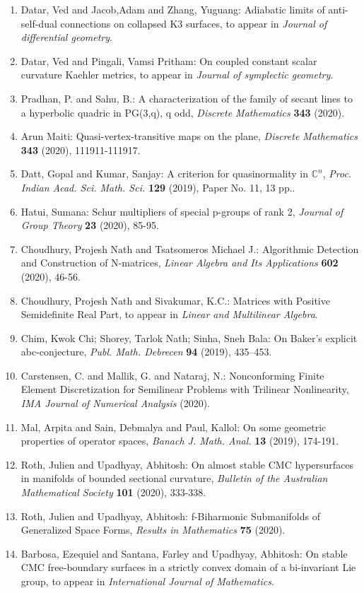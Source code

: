 \begin{enumerate}
\item Datar, Ved and Jacob,Adam and Zhang, Yuguang: Adiabatic limits of anti-self-dual connections on collapsed K3 surfaces, to appear in \emph{Journal of differential geometry}.
\item Datar, Ved and Pingali, Vamsi Pritham: On coupled constant scalar curvature Kaehler metrics, to appear in \emph{Journal of symplectic geometry}.
\item Pradhan, P. and Sahu, B.: A characterization of the family of secant lines to a hyperbolic quadric in PG(3,q), q odd, \emph{Discrete Mathematics} {\bf 343} (2020).
\item Arun Maiti: Quasi-vertex-transitive maps on the plane, \emph{Discrete Mathematics} {\bf 343} (2020), 111911-111917.
\item Datt, Gopal and Kumar, Sanjay: A criterion for quasinormality in $\mathbb{C}^n$, \emph{Proc. Indian Acad. Sci. Math. Sci.} {\bf 129} (2019), Paper No. 11, 13 pp..
\item Hatui, Sumana: Schur multipliers of special p-groups of rank 2, \emph{Journal of Group Theory} {\bf 23} (2020), 85-95.
\item Choudhury, Projesh Nath and Tsatsomeros Michael J.: Algorithmic Detection and Construction of N-matrices, \emph{Linear Algebra and Its Applications} {\bf 602} (2020), 46-56.
\item Choudhury, Projesh Nath and Sivakumar, K.C.: Matrices with Positive Semidefinite Real Part, to appear in \emph{Linear and Multilinear Algebra}.
\item Chim, Kwok Chi; Shorey, Tarlok Nath; Sinha, Sneh Bala: On Baker's explicit abc-conjecture, \emph{Publ. Math. Debrecen} {\bf 94} (2019), 435–453.
\item Carstensen, C. and Mallik, G. and Nataraj, N.: Nonconforming Finite Element Discretization for Semilinear Problems with Trilinear Nonlinearity, \emph{IMA Journal of Numerical Analysis} {\bf } (2020).
\item Mal, Arpita and Sain, Debmalya and Paul, Kallol: On some geometric properties of operator spaces, \emph{Banach J. Math. Anal.} {\bf 13} (2019), 174-191.
\item Roth, Julien and Upadhyay, Abhitosh: On almost stable CMC hypersurfaces in manifolds of bounded sectional curvature, \emph{Bulletin of the Australian Mathematical Society} {\bf 101} (2020), 333-338.
\item Roth, Julien and Upadhyay, Abhitosh: f-Biharmonic Submanifolds of Generalized Space Forms, \emph{Results in Mathematics} {\bf 75} (2020).
\item Barbosa, Ezequiel and Santana, Farley and Upadhyay, Abhitosh: On stable CMC free-boundary surfaces in a strictly convex domain of a bi-invariant Lie group, to appear in \emph{International Journal of Mathematics}.
\end{enumerate}


